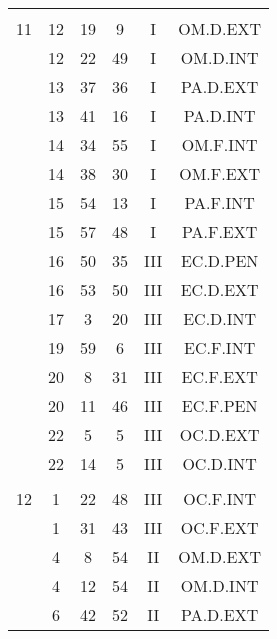 \documentclass[12pt, a4paper]{article}
\begin{document}
\begin{multicols}{3}
{\begin{tabular}{c c c c c c}
	 	 	 	 & & & & & \\%
	 	 	 	11 & 12 & 19 & 9 & I & OM.D.EXT\\%
	 	 	 	 & 12 & 22 & 49 & I & OM.D.INT\\%
	 	 	 	 & 13 & 37 & 36 & I & PA.D.EXT\\%
	 	 	 	 & 13 & 41 & 16 & I & PA.D.INT\\%
	 	 	 	 & 14 & 34 & 55 & I & OM.F.INT\\%
	 	 	 	 & 14 & 38 & 30 & I & OM.F.EXT\\%
	 	 	 	 & 15 & 54 & 13 & I & PA.F.INT\\%
	 	 	 	 & 15 & 57 & 48 & I & PA.F.EXT\\%
	 	 	 	 & 16 & 50 & 35 & III & EC.D.PEN\\%
	 	 	 	 & 16 & 53 & 50 & III & EC.D.EXT\\%
	 	 	 	 & 17 & 3 & 20 & III & EC.D.INT\\%
	 	 	 	 & 19 & 59 & 6 & III & EC.F.INT\\%
	 	 	 	 & 20 & 8 & 31 & III & EC.F.EXT\\%
	 	 	 	 & 20 & 11 & 46 & III & EC.F.PEN\\%
	 	 	 	 & 22 & 5 & 5 & III & OC.D.EXT\\%
	 	 	 	 & 22 & 14 & 5 & III & OC.D.INT\\%
	 	 	 	 & & & & & \\%
	 	 	 	12 & 1 & 22 & 48 & III & OC.F.INT\\%
	 	 	 	 & 1 & 31 & 43 & III & OC.F.EXT\\%
	 	 	 	 & 4 & 8 & 54 & II & OM.D.EXT\\%
	 	 	 	 & 4 & 12 & 54 & II & OM.D.INT\\%
	 	 	 	 & 6 & 42 & 52 & II & PA.D.EXT\\%
	 	 \end{tabular}
 	}
\end{multicols}
\end{document}
